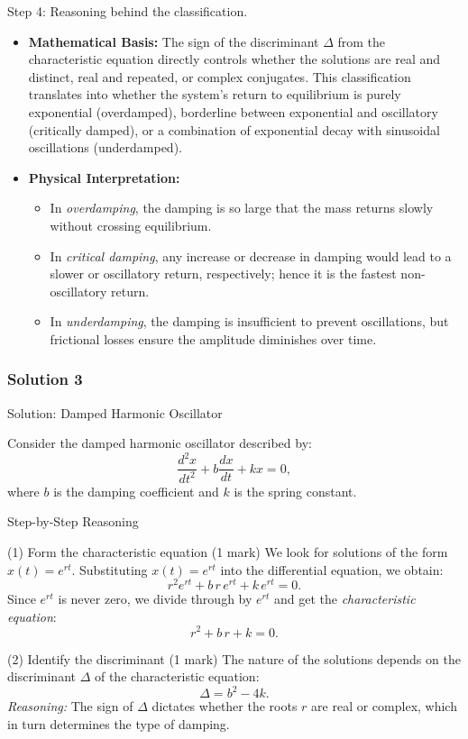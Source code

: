 \documentclass{article}
\begin{document}
{Step 4: Reasoning behind the classification.}
\begin{itemize}
    \item \textbf{Mathematical Basis:} The sign of the discriminant \(\Delta\) from the characteristic equation directly controls whether the solutions are real and distinct, real and repeated, or complex conjugates. This classification translates into whether the system's return to equilibrium is purely exponential (overdamped), borderline between exponential and oscillatory (critically damped), or a combination of exponential decay with sinusoidal oscillations (underdamped).
    \item \textbf{Physical Interpretation:} 
    \begin{itemize}
        \item In \textit{overdamping}, the damping is so large that the mass returns slowly without crossing equilibrium.
        \item In \textit{critical damping}, any increase or decrease in damping would lead to a slower or oscillatory return, respectively; hence it is the fastest non-oscillatory return.
        \item In \textit{underdamping}, the damping is insufficient to prevent oscillations, but frictional losses ensure the amplitude diminishes over time.
    \end{itemize}
\end{itemize}

\subsubsection{Solution 3}

{Solution: Damped Harmonic Oscillator}

Consider the damped harmonic oscillator described by:
\[
\frac{d^2 x}{dt^2} + b \frac{dx}{dt} + kx = 0,
\]
where \(b\) is the damping coefficient and \(k\) is the spring constant.

{Step-by-Step Reasoning}

(1) Form the characteristic equation (1 mark)
We look for solutions of the form \(x(t) = e^{rt}\). Substituting \(x(t) = e^{rt}\) into the differential equation, we obtain:
\[
r^2 e^{rt} + b\,r\,e^{rt} + k\,e^{rt} = 0.
\]
Since \(e^{rt}\) is never zero, we divide through by \(e^{rt}\) and get the \emph{characteristic equation}:
\[
r^2 + b\,r + k = 0.
\]

(2) Identify the discriminant (1 mark)
The nature of the solutions depends on the discriminant \(\Delta\) of the characteristic equation:
\[
\Delta = b^2 - 4k.
\]
\emph{Reasoning:} The sign of \(\Delta\) dictates whether the roots \(r\) are real or complex, which in turn determines the type of damping.
\end{document}
